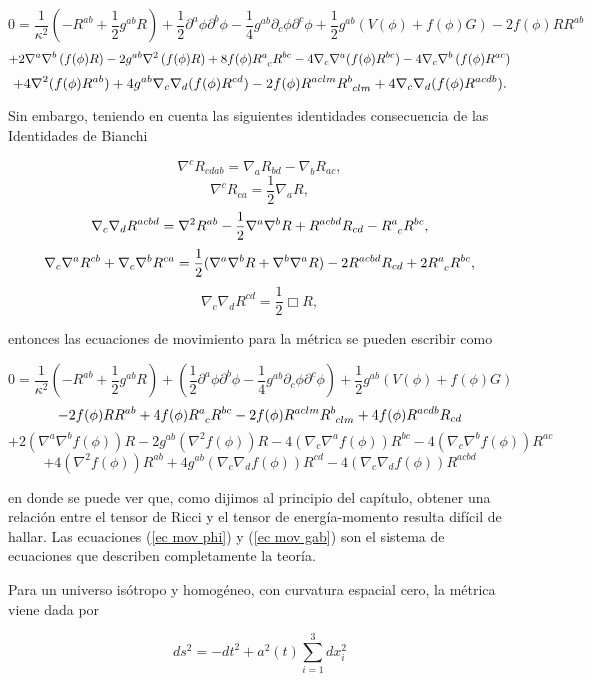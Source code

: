 $$
0=\frac{1}{\kappa^2}\left(-R^{ab} + \frac{1}{2}g^{ab}R\right) + \frac{1}{2}\partial^a\phi \partial^b\phi - \frac{1}{4}g^{ab}\partial_c\phi \partial^c\phi + \frac{1}{2}g^{ab}(V(\phi)+f(\phi)G) - 2f(\phi)RR^{ab} 
$$
$$
+2\nabla^a\nabla^b\left(f(\phi)R\right)- 2g^{ab}\nabla^2\left(f(\phi)R\right) + 8f(\phi)\tensor{R}{^a_c} R^{bc} - 4\nabla_c\nabla^a(f(\phi)R^{bc})- 4\nabla_c\nabla^b \left(f(\phi)R^{ac}\right)
$$
$$
+4\nabla^2(f(\phi)R^{ab})+ 4g^{ab}\nabla_c\nabla_d(f(\phi)R^{cd}) - 2f(\phi)R^{aclm}\tensor{R}{^b_{clm}} + 4\nabla_c\nabla_d(f(\phi) R^{acdb}).
$$

Sin embargo, teniendo en cuenta las siguientes identidades consecuencia de las Identidades de Bianchi

$$
\nabla^cR_{cdab}=\nabla_aR_{bd} - \nabla_bR_{ac} ,
$$
$$
\nabla^cR_{ca} = \frac{1}{2}\nabla_aR ,
$$
$$
\nabla_c\nabla_dR^{acbd} = \nabla^2R^{ab} - \frac{1}{2}\nabla^a\nabla^bR
+ R^{acbd} R_{cd} - \tensor{R}{^a_c}R^{bc} ,
$$
$$      
\nabla_c\nabla^aR^{cb} + \nabla_c\nabla^bR^{ca} = \frac{1}{2}(\nabla^a \nabla^bR + \nabla^b\nabla^aR) - 2R^{acbd} R_{cd} + 2\tensor{R}{^a_c} R^{bc},
$$
$$
\nabla_c\nabla_dR^{cd} = \frac{1}{2}\Box R ,
$$

entonces las ecuaciones de movimiento para la métrica se pueden escribir como 

$$
0=\frac{1}{\kappa^2}\left(-R^{ab} + \frac{1}{2}g^{ab}R\right) +  \left(\frac{1}{2}\partial^a\phi \partial^b\phi - \frac{1}{4}g^{ab} \partial_c\phi \partial^c\phi \right) + \frac{1}{2}g^{ab}(V(\phi)+f(\phi)G)
$$   
$$  
-2f(\phi)RR^{ab} + 4f(\phi)\tensor{R}{^a_{c}}R^{bc} -2f(\phi)R^{aclm}\tensor{R}{^b_{clm}} + 4f(\phi)R^{acdb}R_{cd} 
$$
$$ 
+ 2(\nabla^a\nabla^bf(\phi))R - 2g^{ab}(\nabla^2f(\phi))R - 4(\nabla_c\nabla^af(\phi))R^{bc} - 4(\nabla_c\nabla^bf(\phi))R^{ac} 
$$
\begin{equation}\label{ec mov gab}
+ 4(\nabla^2f(\phi))R^{ab} + 4g^{ab}(\nabla_c\nabla_df(\phi))R^{cd} - 4(\nabla_c\nabla_df(\phi))R^{acbd}
\end{equation}

en donde se puede ver que, como dijimos al principio del capítulo, obtener una relación entre el tensor de Ricci y el tensor de energía-momento resulta difícil de hallar. Las ecuaciones (\ref{ec mov phi}) y (\ref{ec mov gab}) son el sistema de ecuaciones que describen completamente la teoría.

Para un universo isótropo y homogéneo, con curvatura espacial cero, la métrica viene dada por

$$
ds^2=-dt^2 + a^2(t)\sum\limits_{i=1}^3 dx_i^2
$$

